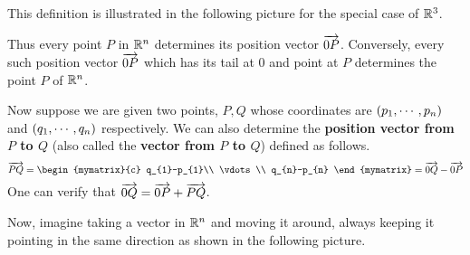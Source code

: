 This definition is illustrated in the following picture for the
special case of $\mathbb{R}^{3}$.

\begin{center}
\end{center}

Thus every point $P$ in $\mathbb{R}^{n}$ determines its position
vector $\overrightarrow{0P}$. Conversely, every such position vector $\overrightarrow{0P}$
which has its tail at $0$ and point at $P$ determines the point $P$ of
$\mathbb{R}^{n}$.

Now suppose we are given two points, $P,Q$ whose
coordinates are $\left(p_{1},\cdots ,p_{n}\right) $ and $\left(
q_{1},\cdots ,q_{n}\right) $ respectively. We can also determine the
\textbf{position vector from $P$ to $Q$} (also called the \textbf{vector from $P$ to $Q$}) defined as follows.
\begin{equation*}
\longvect{PQ} = \begin{mymatrix}{c}
q_{1}-p_{1}\\
 \vdots \\
q_{n}-p_{n}
\end{mymatrix} = \longvect{0Q} - \longvect{0P}
\end{equation*}
One can verify that $\overrightarrow{0Q}=\overrightarrow{0P}+\overrightarrow{PQ}$.

Now, imagine taking a vector in $\mathbb{R}^n$ and moving it around, always
keeping it pointing in the same direction as shown in the following picture.

\begin{center}
\end{center}

